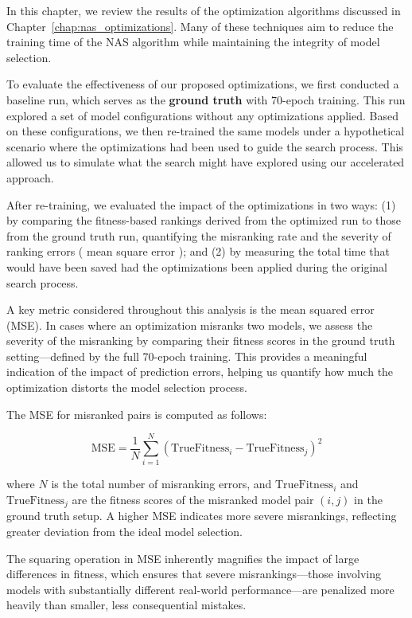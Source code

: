 In this chapter, we review the results of the optimization algorithms discussed in Chapter~\ref{chap:nas_optimizations}. Many of these techniques aim to reduce the training time of the NAS algorithm while maintaining the integrity of model selection. 

To evaluate the effectiveness of our proposed optimizations, we first conducted a baseline run, which serves as the \textbf{ground truth} with 70-epoch training. This run explored a set of model configurations without any optimizations applied. Based on these configurations, we then re-trained the same models under a hypothetical scenario where the optimizations had been used to guide the search process. This allowed us to simulate what the search might have explored using our accelerated approach.

After re-training, we evaluated the impact of the optimizations in two ways: (1) by comparing the fitness-based rankings derived from the optimized run to those from the ground truth run, quantifying the misranking rate and the severity of ranking errors ( mean square error ); and (2) by measuring the total time that would have been saved had the optimizations been applied during the original search process.


A key metric considered throughout this analysis is the mean squared error (MSE). In cases where an optimization misranks two models, we assess the severity of the misranking by comparing their fitness scores in the ground truth setting—defined by the full 70-epoch training. This provides a meaningful indication of the impact of prediction errors, helping us quantify how much the optimization distorts the model selection process.

The MSE for misranked pairs is computed as follows:

\begin{equation}
\text{MSE} = \frac{1}{N} \sum_{i=1}^{N} \left( \text{TrueFitness}_i - \text{TrueFitness}_j \right)^2
\end{equation}

where \( N \) is the total number of misranking errors, and \( \text{TrueFitness}_i \) and \( \text{TrueFitness}_j \) are the fitness scores of the misranked model pair \( (i, j) \) in the ground truth setup. A higher MSE indicates more severe misrankings, reflecting greater deviation from the ideal model selection.

The squaring operation in MSE inherently magnifies the impact of large differences in fitness, which ensures that severe misrankings—those involving models with substantially different real-world performance—are penalized more heavily than smaller, less consequential mistakes.

